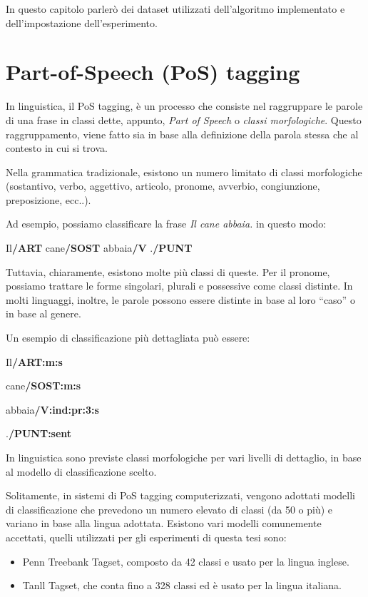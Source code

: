 In questo capitolo parler\`o dei dataset utilizzati dell'algoritmo implementato
e dell'impostazione dell'esperimento.

\section{Part-of-Speech (PoS) tagging}

In linguistica, il PoS tagging, \`e un processo che consiste nel raggruppare le
parole di una frase in classi dette, appunto, \emph{Part of Speech} o \emph{classi
morfologiche}. Questo raggruppamento, viene fatto sia in base alla definizione
della parola stessa che al contesto in cui si trova.

Nella grammatica tradizionale, esistono un numero limitato di classi morfologiche
(sostantivo, verbo, aggettivo, articolo, pronome, avverbio, congiunzione, preposizione, ecc..).

Ad esempio, possiamo classificare la frase \emph{Il cane abbaia.} in questo modo:

\centerline{Il\textbf{/ART} cane\textbf{/SOST} abbaia\textbf{/V} .\textbf{/PUNT}}

Tuttavia, chiaramente, esistono molte pi\`u classi di queste.
Per il pronome, possiamo trattare le forme singolari, plurali e possessive come
classi distinte. In molti linguaggi, inoltre, le parole possono essere distinte
in base al loro ``caso'' o in base al genere.

Un esempio di classificazione pi\`u dettagliata pu\`o essere:

\begin{center}
Il\textbf{/ART:m:s}

cane\textbf{/SOST:m:s}

abbaia\textbf{/V:ind:pr:3:s}

.\textbf{/PUNT:sent}
\end{center}

In linguistica sono previste classi morfologiche per vari livelli di dettaglio,
in base al modello di classificazione scelto.

Solitamente, in sistemi di PoS tagging computerizzati, vengono adottati modelli
di classificazione che prevedono un numero elevato di classi (da 50 o pi\`u) e
variano in base alla lingua adottata. Esistono vari modelli comunemente accettati,
quelli utilizzati per gli esperimenti di questa tesi sono:

\begin{itemize}
  \item Penn Treebank Tagset, composto da 42 classi e usato per la lingua inglese.
  \item Tanll Tagset, che conta fino a 328 classi ed \`e usato per la lingua italiana.
\end{itemize}

